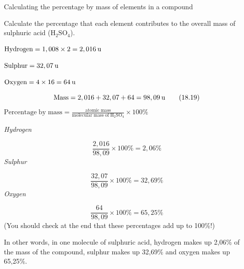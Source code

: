       \begin{wex}{Calculating the percentage by mass of elements in a compound }
{
      \label{m38712*probfhsst!!!underscore!!!id902}
      \label{m38712*id280520}Calculate the percentage that each element contributes to the overall mass of sulphuric acid (${\mathrm{H}}_{2}{\mathrm{SO}}_{4}$).\par 
      \vspace{5pt}}
{
      \label{m38712*id280575}$\mathrm{Hydrogen}=1,008\ensuremath{\times}2=2,016\phantom{\rule{2pt}{0ex}}\mathrm{u}$\par 
      \label{m38712*id280588}$\mathrm{Sulphur}=32,07\phantom{\rule{2pt}{0ex}}\mathrm{u}$\par 
      \label{m38712*id280591}$\mathrm{Oxygen}=4\ensuremath{\times}16=64\phantom{\rule{2pt}{0ex}}\mathrm{u}$\par 
      \label{m38712*id280629}\nopagebreak\noindent{}
        
    \begin{equation}
    \mathrm{Mass}=2,016+32,07+64=98,09\phantom{\rule{2pt}{0ex}}\mathrm{u}\tag{18.19}
      \end{equation}
      \label{m38712*id280688}$\mathrm{Percentage\; by\; mass}=\frac{\mathrm{atomic\; mass}}{\mathrm{molecular\; mass\; of\; H}{}_{2}\mathrm{SO}{}_{4}}\ensuremath{\times}100\%$\par 
      \label{m38712*id280729}
        \textsl{Hydrogen}
      \par 
      \label{m38712*id280735}\nopagebreak\noindent{}
        
    \begin{equation}
    \frac{2,016}{98,09}\ensuremath{\times}100\%=2,06\%\tag{18.20}
      \end{equation}
      \label{m38712*id280780}
        \textsl{Sulphur}
      \par 
      \label{m38712*id280786}\nopagebreak\noindent{}
        
    \begin{equation}
    \frac{32,07}{98,09}\ensuremath{\times}100\%=32,69\%\tag{18.21}
      \end{equation}
      \label{m38712*id280831}
        \textsl{Oxygen}
      \par 
      \label{m38712*id280837}\nopagebreak\noindent{}
        
    \begin{equation}
    \frac{64}{98,09}\ensuremath{\times}100\%=65,25\%\tag{18.22}
      \end{equation}
      \label{m38712*id280876}(You should check at the end that these percentages add up to 100\%!)\par 
      \label{m38712*id280880}In other words, in one molecule of sulphuric acid, hydrogen makes up 2,06\% of the mass of the compound, sulphur makes up 32,69\% and oxygen makes up 65,25\%.\par 
}
    \end{wex}
